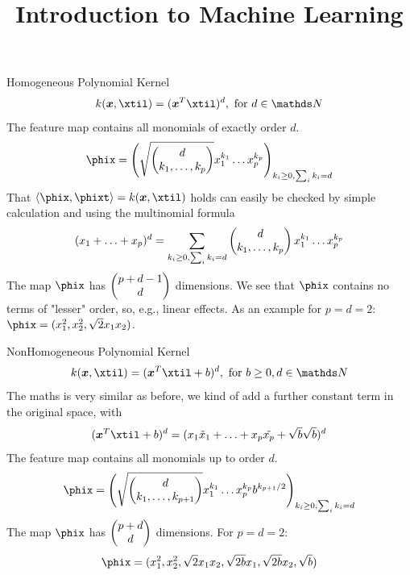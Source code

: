 




\newcommand{\titlefigure}{figure_man/polynom_kernel2.png}
\newcommand{\learninggoals}{
  \item \textcolor{blue}{XXX}
  \item \textcolor{blue}{XXX}
}

\title{Introduction to Machine Learning}
\date{}






\begin{vbframe}{Homogeneous Polynomial Kernel}
$$ k(\xv, \xtil) = (\xv^T \xtil)^d, \text{ for } d \in \N$$
The feature map contains all monomials of exactly order $d$.
  $$\phix = \left( \sqrt{\mat{d \\ k_1, \ldots, k_p}} x_1^{k_1} \ldots x_p^{k_p}\right)_{k_i \geq 0, \sum_i k_i = d}$$
That $\scp{\phix}{\phixt} = k(\xv, \xtil)$ holds can easily be checked by simple calculation
and using the multinomial formula
$$ (x_1 + \ldots + x_p)^d = \sum_{k_i \geq 0, \sum_i k_i = d} \begin{pmatrix} d \\ k_1, \ldots, k_p \end{pmatrix} x_1^{k_1} \ldots x_p^{k_p}$$
The map $\phix$ has $\begin{pmatrix} p + d - 1 \\ d \end{pmatrix}$ dimensions.
We see that $\phix$ contains no terms of "lesser" order, so, e.g., linear effects.
As an example for $p=d=2$: $\phix = (x_1^2, x_2^2, \sqrt{2} x_1 x_2)$.
\end{vbframe}

\begin{vbframe}{NonHomogeneous Polynomial Kernel}
 $$k(\xv, \xtil) = (\xv^T \xtil + b)^d, \text{ for } b\geq 0, d \in \N$$
The maths is very similar as before, we kind of add a further constant term in the original space, with
$$ (\xv^T \xtil + b)^d = (x_1 \tilde{x}_1 + \ldots + x_p \tilde{x_p} + \sqrt{b} \sqrt{b})^d$$
The feature map contains all monomials up to order $d$.
  $$\phix = \left( \sqrt{\mat{d \\ k_1, \ldots, k_{p+1}}} x_1^{k_1} \ldots x_p^{k_p} b^{k_{p+1}/2} \right)_{k_i \geq 0, \sum_i k_i = d}$$
The map $\phix$ has $\begin{pmatrix} p + d\\ d \end{pmatrix}$ dimensions. For $p=d=2$: 
$$\phix = (x_1^2, x_2^2, \sqrt{2} x_1 x_2, \sqrt{2b} x_1, \sqrt{2b} x_2, \sqrt{b})$$
\end{vbframe}


